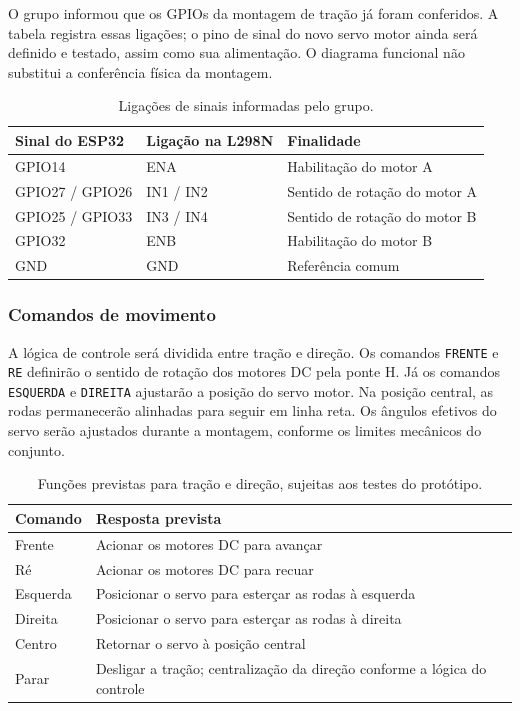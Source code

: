 \documentclass[12pt,a4paper]{article}
\begin{document}
O grupo informou que os GPIOs da montagem de tração já foram conferidos.
A tabela registra essas ligações; o pino de sinal do novo servo motor
ainda será definido e testado, assim como sua alimentação. O diagrama
funcional não substitui a conferência física da montagem.

\begin{table}[H]
\centering\small\renewcommand{\arraystretch}{1.25}
\begin{tabular}{l l l}
\toprule
\textbf{Sinal do ESP32} & \textbf{Ligação na L298N} & \textbf{Finalidade} \\
\midrule
GPIO14 & ENA & Habilitação do motor A \\
GPIO27 / GPIO26 & IN1 / IN2 & Sentido de rotação do motor A \\
GPIO25 / GPIO33 & IN3 / IN4 & Sentido de rotação do motor B \\
GPIO32 & ENB & Habilitação do motor B \\
GND & GND & Referência comum \\
\bottomrule
\end{tabular}
\caption{Ligações de sinais informadas pelo grupo.}
\label{tab:ligacoes}
\end{table}

\subsubsection{Comandos de movimento}
A lógica de controle será dividida entre tração e direção. Os comandos
\texttt{FRENTE} e \texttt{RE} definirão o sentido de rotação dos motores DC
pela ponte H. Já os comandos \texttt{ESQUERDA} e \texttt{DIREITA} ajustarão
a posição do servo motor. Na posição central, as rodas permanecerão
alinhadas para seguir em linha reta. Os ângulos efetivos do servo serão
ajustados durante a montagem, conforme os limites mecânicos do conjunto.

\begin{table}[H]
\centering\small\renewcommand{\arraystretch}{1.3}
\begin{tabularx}{\textwidth}{l >{\raggedright\arraybackslash}X}
\toprule
\textbf{Comando} & \textbf{Resposta prevista} \\
\midrule
Frente & Acionar os motores DC para avançar \\
Ré & Acionar os motores DC para recuar \\
Esquerda & Posicionar o servo para esterçar as rodas à esquerda \\
Direita & Posicionar o servo para esterçar as rodas à direita \\
Centro & Retornar o servo à posição central \\
Parar & Desligar a tração; centralização da direção conforme a lógica do controle \\
\bottomrule
\end{tabularx}
\caption{Funções previstas para tração e direção, sujeitas aos testes do protótipo.}
\label{tab:movimentos}
\end{table}
\end{document}
